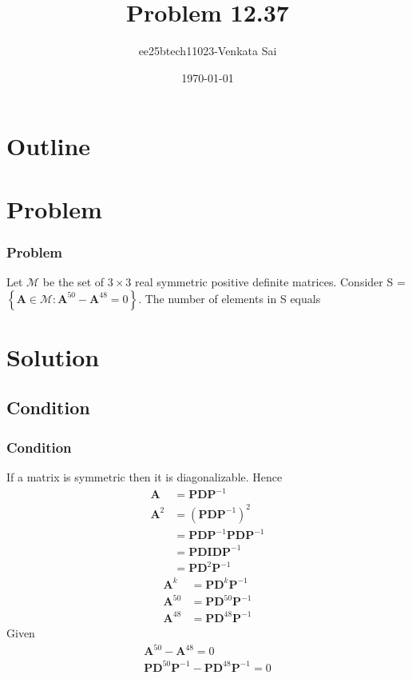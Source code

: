 \documentclass{beamer}
\title{Problem 12.37}
\author{ee25btech11023-Venkata Sai}
\date{\today}
\providecommand{\brak}[1]{\ensuremath{\left(#1\right)}}
\providecommand{\cbrak}[1]{\ensuremath{\left\{#1\right\}}}
\theoremstyle{remark}
\let\vec\mathbf
\numberwithin{equation}{section}
\begin{document}
\begin{frame}
\titlepage
\end{frame}

\section*{Outline}
\begin{frame}
\tableofcontents
\end{frame}

\section{Problem}

\begin{frame}
\frametitle{Problem}
Let $\mathcal{M}$ be the set of $3\times3 $ real symmetric positive definite matrices. Consider S =
$\cbrak{\vec{A} \in \mathcal{M}: \vec{A}^{50} - \vec{A}^{48} = 0 }$. The number of elements in S equals
\end{frame}
\section{Solution}

 
\subsection{Condition}
\begin{frame}
\frametitle{Condition}
 If a matrix is symmetric then it is  diagonalizable. Hence
 \begin{align}
     \vec{A}&=\vec{P}\vec{D}\vec{P}^{-1} \\
      \vec{A}^2&=\brak{\vec{P}\vec{D}\vec{P}^{-1}}^2 \\
      &=\vec{P}\vec{D}\vec{P}^{-1}\vec{P}\vec{D}\vec{P}^{-1}\\
      &=\vec{P}\vec{D}\vec{I}\vec{D}\vec{P}^{-1}\\
      &=\vec{P}\vec{D}^2\vec{P}^{-1}
 \end{align}
 \begin{align}
     \vec{A}^k&=\vec{P}\vec{D}^k\vec{P}^{-1}\\
     \vec{A}^{50}&=\vec{P}\vec{D}^{50}\vec{P}^{-1}\\
     \vec{A}^{48}&=\vec{P}\vec{D}^{48}\vec{P}^{-1}
 \end{align}
 Given 
 \begin{align}
   \vec{A}^{50} - \vec{A}^{48} = 0\\
   \vec{P}\vec{D}^{50}\vec{P}^{-1}-\vec{P}\vec{D}^{48}\vec{P}^{-1}=0 
   \end{align}
\end{frame}
\end{document}
